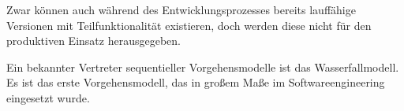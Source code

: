 Zwar können auch während des Entwicklungsprozesses bereits lauffähige Versionen mit Teilfunktionalität existieren, doch werden diese nicht für den produktiven Einsatz herausgegeben.

Ein bekannter Vertreter sequentieller Vorgehensmodelle ist das Wasserfallmodell. Es ist das erste Vorgehensmodell, das in großem Maße im Softwareengineering eingesetzt wurde.
